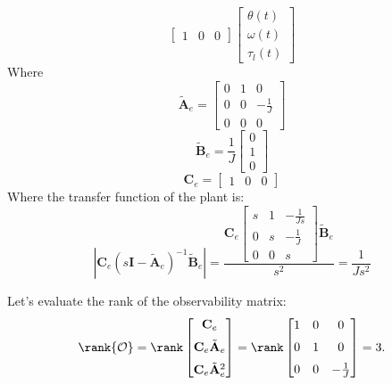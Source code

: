 \documentclass[12pt,a4paper,oneside]{book}
\begin{document}
\begin{onehalfspace}
\begin{equation}
\begin{bmatrix}
			1 & 0 & 0
		\end{bmatrix}
		\begin{bmatrix}
			\theta(t) \\[6pt]
			\omega(t) \\[6pt]
			\tau_l(t) 
		\end{bmatrix}
	\end{equation} 
	Where
	\begin{equation}
		\tilde{\mathbf{A}}_e = \begin{bmatrix}
			0 & 1 & 0 \\[6pt]
			0 & 0 & -\frac{1}{J} \\[6pt]
			0 & 0 & 0
		\end{bmatrix}
	\end{equation}
	\begin{equation}
		\tilde{\mathbf{B}}_e = \frac{1}{J}\begin{bmatrix}
			0 \\[6pt]
			1 \\[6pt]
			0
		\end{bmatrix}
	\end{equation}
	\begin{equation}
		\mathbf{C}_e = \begin{bmatrix}
			1 & 0 & 0
		\end{bmatrix}
	\end{equation}
	Where the transfer function of the plant is:
	\begin{equation} \label{example_1_eq7}
		|\mathbf{C}_e(s\mathbf{I}-\tilde{\mathbf{A}}_e)^{-1}\tilde{\mathbf{B}}_e| = \frac{\mathbf{C}_e
			\begin{bmatrix}
				s & 1 & -\frac{1}{Js} \\[6pt]
				0 & s & -\frac{1}{J} \\[6pt]
				0 & 0 & s
			\end{bmatrix} \tilde{\mathbf{B}}_e
		}{s^2} = \frac{1}{Js^2}
	\end{equation}
	
	Let's evaluate the rank of the observability matrix:
	\begin{equation} \label{example_1_eq8}
		\rank{\mathcal{O}} = \rank \begin{bmatrix}
			\mathbf{C}_e  \\[6pt]
			\mathbf{C}_e\tilde{\mathbf{A}}_e \\[6pt]
			\mathbf{C}_e\tilde{\mathbf{A}}_e^2
		\end{bmatrix} = \rank
		\begin{bmatrix}
			1 & 0 & 0 \\[6pt]
			0 & 1 & 0 \\[6pt]
			0 & 0 & -\frac{1}{J}
		\end{bmatrix} = 3.
	\end{equation} 
	

\end{onehalfspace}
\end{document}
